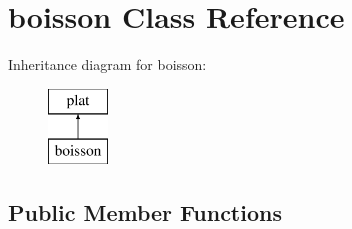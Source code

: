 \hypertarget{classboisson}{}\section{boisson Class Reference}
\label{classboisson}
Inheritance diagram for boisson\+:\begin{figure}[H]
\begin{center}
\leavevmode
\includegraphics[height=2.000000cm]{classboisson}
\end{center}
\end{figure}
\subsection*{Public Member Functions}
